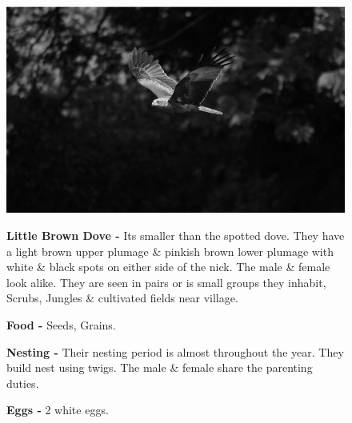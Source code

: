 \begin{figure}[H]
\begin{center}
\includegraphics{figure/Land_birds/01_pariah_kite/pariah-kite.eps}
\end{center}
\medskip
\noindent
{\bf Little Brown Dove -} Its smaller than the spotted dove. They have a light brown upper plumage \& pinkish brown lower plumage with white \& black spots on either side of the nick. The male \& female look alike. They are seen in pairs or is small groups they inhabit, Scrubs, Jungles \& cultivated fields near village. 

\medskip
{\bf Food -} Seeds, Grains.

{\bf Nesting -} Their nesting period is almost throughout the year. They build nest using twigs. The male \& female share the parenting duties.

{\bf Eggs -} 2 white eggs.
\end{figure}

\vfill\eject

~\phantom{a}
\vfill

